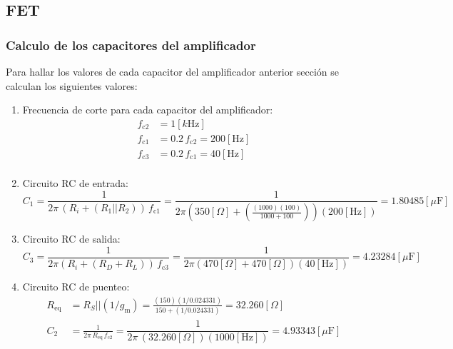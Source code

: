\subsection{FET}

\subsubsection{Calculo de los capacitores del amplificador}
Para hallar los valores de cada capacitor del amplificador anterior sección se
calculan los siguientes valores:

\begin{enumerate}
\item Frecuencia de corte para cada capacitor del amplificador:
\begin{equation*}
    \begin{split}
        f_{\text{c2}} &= 1[k\text{Hz}]\\
        f_{\text{c1}} &= 0.2\,f_{\text{c2}} = 200[\text{Hz}]\\
        f_{\text{c3}} &= 0.2\,f_{\text{c1}} = 40[\text{Hz}]\\
    \end{split}
\end{equation*}
\item Circuito RC de entrada:
\begin{equation*}
    C_1 = \frac{1}{2\pi\,(R_i + (R_1 || R_2))\,f_{\text{c1}}}
    = \frac{1}{2\pi(350[\Omega]+(\frac{(1000)(100)}{1000+100}))(200[\text{Hz}])}
    = 1.80485[\mu\text{F}]
\end{equation*}
\item Circuito RC de salida:
\begin{equation*}
    C_3 = \frac{1}{2\pi(R_i + (R_D + R_L))\,f_{\text{c3}}}
        = \frac{1}{2\pi(470[\Omega]+470[\Omega])(40[\text{Hz}])}
        = 4.23284[\mu\text{F}]
\end{equation*}
\item Circuito RC de puenteo:
\begin{equation*}
    \begin{split}
        R_{\text{eq}} &= R_S || (1/g_{\text{m}})
                       = \frac{(150)(1/0.024331)}{150+(1/0.024331)}
                       = 32.260[\Omega]\\
        C_2 &= \frac{1}{2\pi\,R_{\text{eq}}\,f_{\text{c2}}}
             = \dfrac{1}{2\pi\,(32.260[\Omega])(1000[\text{Hz}])}
             = 4.93343[\mu\text{F}]\\
    \end{split}
\end{equation*}
\end{enumerate}

